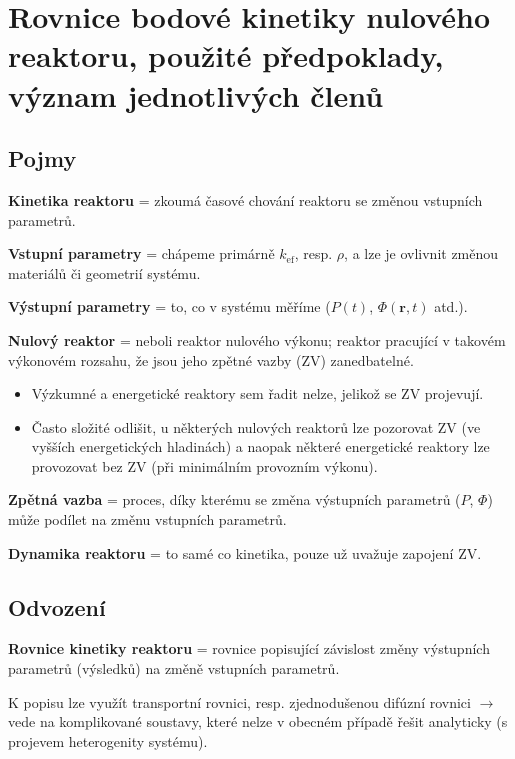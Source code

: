 \section[Bodová kinetika]{Rovnice bodové kinetiky nulového reaktoru, použité předpoklady, význam jednotlivých členů}

\subsection{Pojmy}

\textbf{Kinetika reaktoru} = zkoumá časové chování reaktoru se změnou vstupních parametrů.

\textbf{Vstupní parametry} = chápeme primárně $k_{\text{ef}}$, resp. $\rho$, a lze je ovlivnit změnou materiálů či geometrií systému.

\textbf{Výstupní parametry} = to, co v systému měříme ($P(t)$, $\Phi (\textbf{r}, t) $ atd.).

\textbf{Nulový reaktor} = neboli reaktor nulového výkonu; reaktor pracující v takovém výkonovém rozsahu, že jsou jeho zpětné vazby (ZV) zanedbatelné.

\begin{itemize}
  \item Výzkumné a energetické reaktory sem řadit nelze, jelikož se ZV projevují.
  \item Často složité odlišit, u některých nulových reaktorů lze pozorovat ZV (ve vyšších energetických hladinách) a naopak některé energetické reaktory lze provozovat bez ZV (při minimálním provozním výkonu).
\end{itemize}

\textbf{Zpětná vazba} = proces, díky kterému se změna výstupních parametrů ($P$, $\Phi$) může podílet na změnu vstupních parametrů.

\textbf{Dynamika reaktoru} = to samé co kinetika, pouze už uvažuje zapojení ZV.

\subsection{Odvození}

\textbf{Rovnice kinetiky reaktoru} = rovnice popisující závislost změny výstupních parametrů (výsledků) na změně vstupních parametrů.

K popisu lze využít transportní rovnici, resp. zjednodušenou difúzní rovnici $\rightarrow$ vede na komplikované soustavy, které nelze v obecném případě řešit analyticky (s projevem heterogenity systému).

